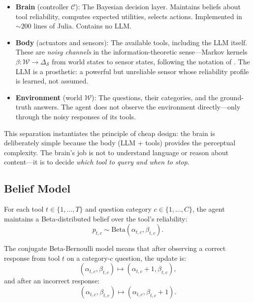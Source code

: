 \documentclass[11pt]{article}
\newcommand{\Beta}{\mathrm{Beta}}
\begin{document}
\begin{itemize}
\item \textbf{Brain} (controller $\mathcal{C}$): The Bayesian decision layer. Maintains beliefs about tool reliability, computes expected utilities, selects actions. Implemented in ${\sim}200$ lines of Julia. Contains no LLM.
\item \textbf{Body} (actuators and sensors): The available tools, including the LLM itself. These are \emph{noisy channels} in the information-theoretic sense---Markov kernels $\beta: \mathcal{W} \to \Delta_\mathcal{S}$ from world states to sensor states, following the notation of \citet{ay2015geometric}. The LLM is a prosthetic: a powerful but unreliable sensor whose reliability profile is learned, not assumed.
\item \textbf{Environment} (world $\mathcal{W}$): The questions, their categories, and the ground-truth answers. The agent does not observe the environment directly---only through the noisy responses of its tools.
\end{itemize}

This separation instantiates the principle of cheap design: the brain is deliberately simple because the body (LLM + tools) provides the perceptual complexity. The brain's job is not to understand language or reason about content---it is to decide \emph{which tool to query and when to stop}.

\subsection{Belief Model}
\label{sec:beliefs}

For each tool $t \in \{1, \ldots, T\}$ and question category $c \in \{1, \ldots, C\}$, the agent maintains a Beta-distributed belief over the tool's reliability:
\begin{equation}
  p_{t,c} \sim \Beta(\alpha_{t,c}, \beta_{t,c}).
  \label{eq:beta}
\end{equation}

The conjugate Beta-Bernoulli model means that after observing a correct response from tool $t$ on a category-$c$ question, the update is:
\begin{equation}
  (\alpha_{t,c}, \beta_{t,c}) \mapsto (\alpha_{t,c} + 1, \beta_{t,c}),
\end{equation}
and after an incorrect response:
\begin{equation}
  (\alpha_{t,c}, \beta_{t,c}) \mapsto (\alpha_{t,c}, \beta_{t,c} + 1).
\end{equation}
\end{document}

